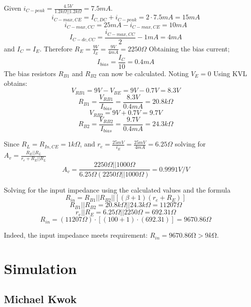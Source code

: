 \documentclass[12pt]{article}
\begin{document}
Given $i_{C-peak} = \frac{4.5V}{1.2k\Omega || 1.2k\Omega} = 7.5mA$.
$$i_{C-max, CE} = I_{C, DC} + i_{C-peak} = 2 \cdot 7.5mA = 15mA$$
$$i_{C-max, CC} = 25mA - i_{C-max, CE} = 10mA$$
$$I_{C-dc, CC} = \frac{i_{C-max, CC}}{2} - 1mA = 4mA$$
and $I_C = I_E$.
Therefore $R_E = \frac{9V}{I_E} = \frac{9V}{4mA} = 2250\Omega$
Obtaining the bias current; $$I_{bias} = \frac{I_C}{10} = 0.4mA$$
The bias resistors $R_{B1}$ and $R_{B2}$ can now be calculated.
Noting $V_E = 0$ Using KVL obtains:
$$V_{RB1} = 9V - V_{BE} = 9V - 0.7V = 8.3V$$
$$R_{B1} = \frac{V_{RB1}}{I_{bias}} = \frac{8.3V}{0.4mA} = 20.8k\Omega$$
$$V_{RB2} = 9V + 0.7V = 9.7V$$
$$R_{B2} = \frac{V_{RB2}}{I_{bias}} = \frac{9.7V}{0.4mA} = 24.3k\Omega$$

Since $R_L = R_{In, CE} = 1k\Omega$, and $r_e = \frac{25mV}{i_E} = \frac{25mV}{4mA} = 6.25\Omega$ solving for $A_v = \frac{R_E || R_L}{r_e + R_E||R_L}$
$$A_v = \frac{2250\Omega || 1000\Omega}{6.25\Omega(2250\Omega || 1000\Omega)} = 0.9991V/V$$

Solving for the input impedance using the calculated values and the formula
$$R_{in} = R_{B1} || R_{B2}||[(\beta+1)(r_e + R_E)]$$
$$R_{B1} || R_{B2} = 20.8k\Omega || 24.3k\Omega = 11207\Omega$$
$$r_e || R_E = 6.25\Omega || 2250\Omega = 692.31\Omega$$
$$R_{in} = (11207\Omega)\cdot[(100 + 1)\cdot(692.31)] = 9670.86\Omega$$

Indeed, the input impedance meets requirement: $R_{in} = 9670.86\si{\ohm} > 9k\si{\ohm}$.

\section{Simulation}

\subsection{Michael Kwok}
\end{document}
